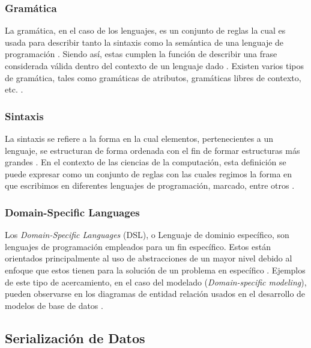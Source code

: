 \subsubsection{Gramática}


La gramática, en el caso de los lenguajes, es un conjunto de reglas la cual es usada para describir tanto la sintaxis como la semántica de una lenguaje de programación \cite{Sebesta2012}. Siendo así, estas cumplen la función de describir una frase considerada válida dentro del contexto de un lenguaje dado \cite[p. 101]{Sipser2012-wl}. Existen varios tipos de gramática, tales como gramáticas de atributos, gramáticas libres de contexto, etc. \cite{Sebesta2012}.

\subsubsection{Sintaxis}

La sintaxis se refiere a la forma en la cual elementos, pertenecientes a un lenguaje, se estructuran de forma ordenada con el fin de formar estructuras más grandes \cite{MerriamWebsterSyntax}. En el contexto de las ciencias de la computación, esta definición se puede expresar como un conjunto de reglas con las cuales regimos la forma en que escribimos en diferentes lenguajes de programación, marcado, entre otros \cite[p. 51]{Friedman2008}.

\subsubsection{Domain-Specific Languages} %

Los \textit{Domain-Specific Languages} (DSL), o Lenguaje de dominio específico, son lenguajes de programación empleados para un fin específico. Estos están orientados principalmente al uso de abstracciones de un mayor nivel debido al enfoque que estos tienen para la solución de un problema en específico \cite{Kelly2008}. Ejemplos de este tipo de acercamiento, en el caso del modelado (\textit{Domain-specific modeling}), pueden observarse en los diagramas de entidad relación usados en el desarrollo de modelos de base de datos \cite{Celikovic2014ADF}. 

\subsection{Serialización de Datos}

